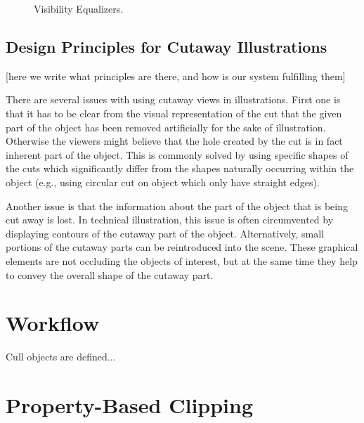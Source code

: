 \begin{figure*}[t]
 \centering
 \caption{\label{fig:his}Visibility Equalizers.}
\end{figure*}

\subsection{Design Principles for Cutaway Illustrations}
[here we write what principles are there, and how is our system fulfilling them]
\cite{Lidal12}

There are several issues with using cutaway views in illustrations.
First one is that it has to be clear from the visual representation of the cut that the given part of the object has been removed artificially for the sake of illustration.
Otherwise the viewers might believe that the hole created by the cut is in fact inherent part of the object.
This is commonly solved by using specific shapes of the cuts which significantly differ from the shapes naturally occurring within the object (e.g., using circular cut on object which only have straight edges).

Another issue is that the information about the part of the object that is being cut away is lost.
In technical illustration, this issue is often circumvented by displaying contours of the cutaway part of the object.
Alternatively, small portions of the cutaway parts can be reintroduced into the scene.
These graphical elements are not occluding the objects of interest, but at the same time they help to convey the overall shape of the cutaway part.

\section{Workflow}

Cull objects are defined...

\section{Property-Based Clipping}

